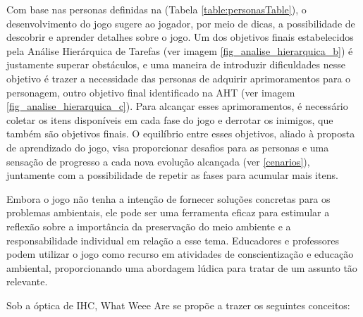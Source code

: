 Com base nas personas definidas na (Tabela \ref{table:personasTable}), o desenvolvimento do jogo sugere ao jogador, por meio de dicas, a possibilidade de descobrir e aprender detalhes sobre o jogo. Um dos objetivos finais estabelecidos pela Análise Hierárquica de Tarefas (ver imagem \ref{fig_analise_hierarquica_b}) é justamente superar obstáculos, e uma maneira de introduzir dificuldades nesse objetivo é trazer a necessidade das personas de adquirir aprimoramentos para o personagem, outro objetivo final identificado na AHT (ver imagem \ref{fig_analise_hierarquica_c}). Para alcançar esses aprimoramentos, é necessário coletar os itens disponíveis em cada fase do jogo e derrotar os inimigos, que também são objetivos finais. O equilíbrio entre esses objetivos, aliado à proposta de aprendizado do jogo, visa proporcionar desafios para as personas e uma sensação de progresso a cada nova evolução alcançada (ver \ref{cenarios}), juntamente com a possibilidade de repetir as fases para acumular mais itens.

Embora o jogo não tenha a intenção de fornecer soluções concretas para os problemas ambientais, ele pode ser uma ferramenta eficaz para estimular a reflexão sobre a importância da preservação do meio ambiente e a responsabilidade individual em relação a esse tema. Educadores e professores podem utilizar o jogo como recurso em atividades de conscientização e educação ambiental, proporcionando uma abordagem lúdica para tratar de um assunto tão relevante.

Sob a óptica de IHC, What Weee Are se propõe a trazer os seguintes conceitos:

